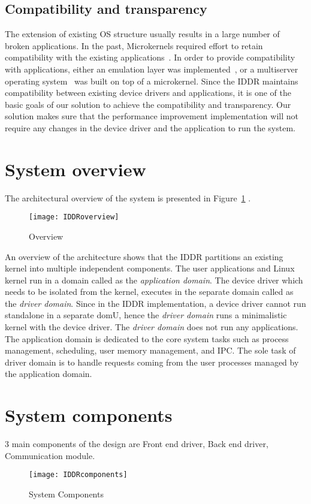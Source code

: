 \subsection{Compatibility and transparency} 
The extension of existing OS structure usually results in a large number of broken applications. In the past, Microkernels required effort to retain compatibility with the existing applications~\cite{Heiser06arevirtualmachine}. In order to provide compatibility with applications, either an emulation layer was implemented~\cite{Heiser06arevirtualmachine}, or a multiserver operating system~\cite{Gefflaut00thesawmill, Tanenbaum06canwe} was built on top of a microkernel. Since the IDDR maintains compatibility between existing device drivers and applications, it is one of the basic goals of our solution to achieve the compatibility and transparency. Our solution makes sure that the performance improvement implementation will not require any changes in the device driver and the application to run the system.

\section{System overview}\label{overview}
The architectural overview of the system is presented in Figure~\ref{fig:overview} .
\begin{figure}[!ht]
\centering
\texttt{[image: IDDRoverview]}
\caption{Overview}
\label{fig:overview}
\end{figure}
An overview of the architecture shows that the IDDR partitions an existing kernel into multiple independent components. The user applications and Linux kernel run in a domain called as the \textit{application domain}. The device driver which needs to be isolated from the kernel, executes in the separate domain called as the \textit{driver domain}. Since in the IDDR implementation, a device driver cannot run standalone in a separate domU, hence the \textit{driver domain} runs a minimalistic kernel with the device driver. The \textit{driver domain} does not run any applications. The application domain is dedicated to the core system tasks such as process management, scheduling, user memory management, and IPC. The sole task of driver domain is to handle requests coming from the user processes managed by the application domain.

\section{System components}\label{components}
3 main components of the design are Front end driver, Back end driver, Communication module.
\begin{figure}[!ht]
\centering
\texttt{[image: IDDRcomponents]}
\caption{System Components}
\label{fig:Design Evo1}
\end{figure}

